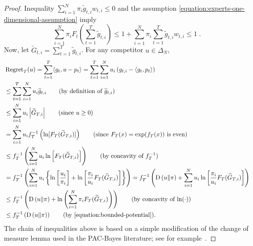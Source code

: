 \begin{proof}
Inequality $\sum_{i=1}^N \pi_i \widetilde g_{t,i} w_{t,i} \le 0$ and the assumption
\eqref{equation:experts-one-dimensional-assumption} imply
\begin{equation}
\label{equation:bounded-potential}
\sum_{i=1}^N  \pi_i F_t \left(\sum_{t=1}^T \widetilde g_{t,i} \right)
\le 1 + \sum_{i=1}^N \pi_i \sum_{t=1}^T  \widetilde g_{t,i} w_{t,i} \le 1 \; .
\end{equation}
Now, let $\widetilde G_{t,i} =
\sum_{t=1}^T \widetilde g_{t,i}$. For any competitor $u \in \Delta_N$,
\begingroup
\allowdisplaybreaks
\begin{align*}
\allowdisplaybreaks
&\Regret_T(u)
= \sum_{t=1}^T \langle g_t, u - p_t \rangle
= \sum_{t=1}^T \sum_{i=1}^N u_i \left(g_{t,i} - \langle g_t, p_t \rangle \right) \\
& \le \sum_{t=1}^T \sum_{i=1}^N u_i \widetilde g_{t,i} \qquad \text{(by definition of $\widetilde g_{t,i}$)} \\
& \le \sum_{i=1}^N u_i \left|\widetilde G_{T,i}\right| \qquad \text{(since $u \ge 0$)}  \\
& = \sum_{i=1}^N u_i f_T^{-1}\left(\ln [F_T(\widetilde G_{T,i})] \right)  \qquad \text{(since $F_T(x) = \exp(f_T(x))$ is even)} \\
& \le f_T^{-1}\left(\sum_{i=1}^N u_i \ln \left[ F_T(\widetilde G_{T,i}) \right]\right) \qquad \text{(by concavity of $f_T^{-1}$)} \\
& = f_T^{-1}\left(\sum_{i=1}^N u_i \left\{\ln \left[\frac{u_i}{\pi_i}\right] +\ln \left[ \frac{\pi_i}{u_i} F_T(\widetilde G_{T,i}) \right] \right\} \right)
= f_T^{-1}\left(\KL{u}{\pi}+\sum_{i=1}^N u_i\ln \left[\frac{\pi_i}{u_i} F_T(\widetilde G_{T,i}) \right]\right) \\
& \le f_T^{-1}\left(\KL{u}{\pi}+\ln \left(\sum_{i=1}^N \pi_i F_T(\widetilde G_{T,i}) \right)\right) \qquad \text{(by concavity of $\ln(\cdot)$)} \\
& \le f_T^{-1}\left(\KL{u}{\pi}\right) \qquad \text{(by \eqref{equation:bounded-potential})}.
\end{align*}
\endgroup
The chain of inequalities above is based on a simple modification of the change
of measure lemma used in the PAC-Bayes literature; see for
example~\citet{McAllester-2013}.
\end{proof}

